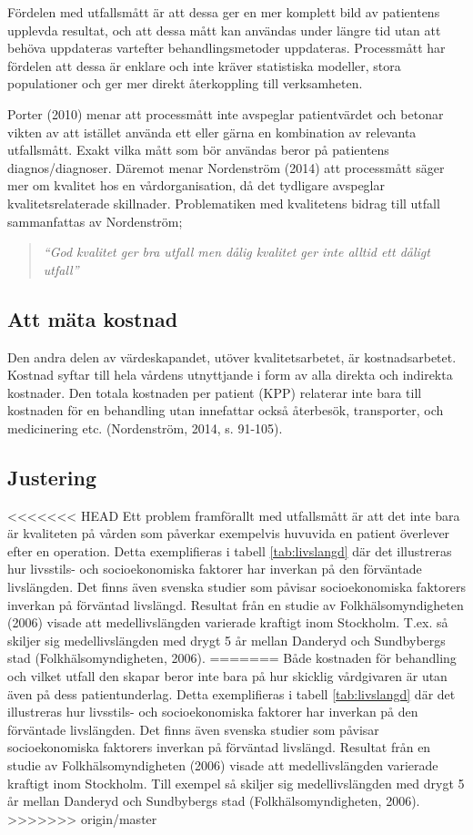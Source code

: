 Fördelen med utfallsmått är att dessa ger en mer komplett bild av patientens upplevda resultat, och att dessa mått kan användas under längre tid utan att behöva uppdateras vartefter behandlingsmetoder  uppdateras. Processmått har fördelen att dessa är enklare och inte kräver statistiska modeller, stora populationer och ger mer direkt återkoppling till verksamheten. 
 
Porter (2010) menar att processmått inte avspeglar patientvärdet och betonar vikten av att istället använda ett eller gärna en kombination av relevanta utfallsmått. Exakt vilka mått som bör användas beror på patientens diagnos/diagnoser. Däremot menar Nordenström (2014) att processmått säger mer om kvalitet hos en vårdorganisation, då det tydligare avspeglar kvalitetsrelaterade skillnader. Problematiken med kvalitetens bidrag till utfall sammanfattas av Nordenström;
\begin{quotation}
\textit{“God kvalitet ger bra utfall men dålig kvalitet ger inte alltid ett dåligt utfall”}
\end{quotation}

\subsection{Att mäta kostnad}

Den andra delen av värdeskapandet, utöver kvalitetsarbetet, är kostnadsarbetet. Kostnad syftar till hela vårdens utnyttjande i form av alla direkta och indirekta kostnader. Den totala kostnaden per patient (KPP) relaterar inte bara till kostnaden för en behandling utan innefattar också återbesök, transporter, och medicinering etc. (Nordenström, 2014, s. 91-105). 

\subsection{Justering}

<<<<<<< HEAD
Ett problem framförallt med utfallsmått är att det inte bara är kvaliteten på vården som påverkar exempelvis huvuvida en patient överlever efter en operation. Detta exemplifieras i tabell \ref{tab:livslangd} där det illustreras hur livsstils- och socioekonomiska faktorer har inverkan på den förväntade livslängden. Det finns även svenska studier som påvisar socioekonomiska faktorers inverkan på förväntad livslängd. Resultat från en studie av Folkhälsomyndigheten (2006) visade att medellivslängden varierade kraftigt inom Stockholm. T.ex. så skiljer sig medellivslängden med drygt 5 år mellan Danderyd och Sundbybergs stad (Folkhälsomyndigheten, 2006).
=======
Både kostnaden för behandling och vilket utfall den skapar beror inte bara på hur skicklig vårdgivaren är utan även på dess patientunderlag.
Detta exemplifieras i tabell \ref{tab:livslangd} där det illustreras hur
livsstils- och socioekonomiska faktorer har inverkan på den förväntade
livslängden. Det finns även svenska studier som påvisar socioekonomiska
faktorers inverkan på förväntad livslängd. Resultat från en studie av
Folkhälsomyndigheten (2006) visade att medellivslängden varierade kraftigt inom
Stockholm. Till exempel så skiljer sig medellivslängden med drygt 5 år mellan
Danderyd och Sundbybergs stad (Folkhälsomyndigheten, 2006).
>>>>>>> origin/master

